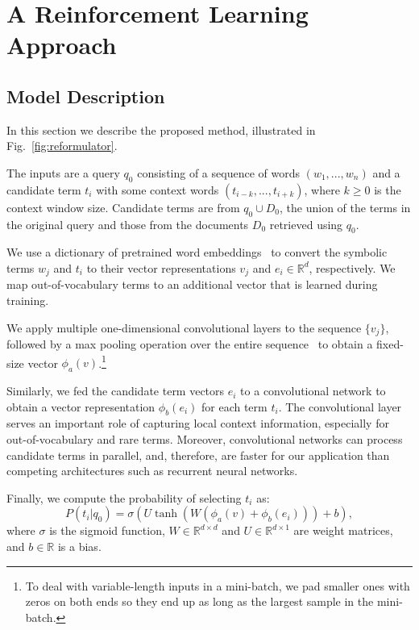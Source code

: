 \documentclass[11pt,letterpaper]{article}
\newcommand{\RR}[0]{\mathbb{R}}
\begin{document}
\section{A Reinforcement Learning Approach}
\label{sec:rl}

\subsection{Model Description}

In this section we describe the proposed method, illustrated in Fig.~\ref{fig:reformulator}.

The inputs are a query $q_0$ consisting of a sequence of words
$(w_1, ..., w_n)$ and a candidate term $t_i$ with some context words $(t_{i-k},...,t_{i+k})$, where $k \geq 0$ is the context window size. Candidate terms are from $q_0 \cup D_0$, the union of the terms in the original query and those from the documents $D_0$ retrieved using $q_0$.

We use a dictionary of pretrained word embeddings~\cite{mikolov2013efficient} to convert the symbolic terms ${w_j}$ and ${t_i}$ to their vector representations $v_j$ and $e_i \in \RR^d$, respectively. We map out-of-vocabulary terms to an additional vector that is learned during training.

We apply multiple one-dimensional convolutional layers to the sequence $\{v_j\}$, followed by a max pooling operation over the entire sequence~\cite{kim2014convolutional} to obtain a fixed-size vector $\phi_a(v)$.\footnote{To deal with variable-length inputs in a mini-batch, we pad smaller ones with zeros on both ends so they end up as long as the largest sample in the mini-batch.}

Similarly, we fed the candidate term vectors ${e_i}$ to a convolutional network to obtain a vector representation ${\phi_b(e_i)}$ for each term $t_i$. The convolutional layer serves an important role of capturing local context information, especially for out-of-vocabulary and rare terms. Moreover, convolutional networks can process candidate terms in parallel, and, therefore, are faster for our application than competing architectures such as recurrent neural networks.

Finally, we compute the probability of selecting $t_i$ as:
\begin{equation} \label{eq:1}
P(t_i|q_0) = \sigma( U \tanh(W(\phi_a(v) + \phi_b(e_i))) + b),
\end{equation}
where $\sigma$ is the sigmoid function, $W \in \RR^{d \times d}$ and $U \in \RR^{d \times 1}$ are weight matrices, and $b \in \RR$ is a bias.
\end{document}
